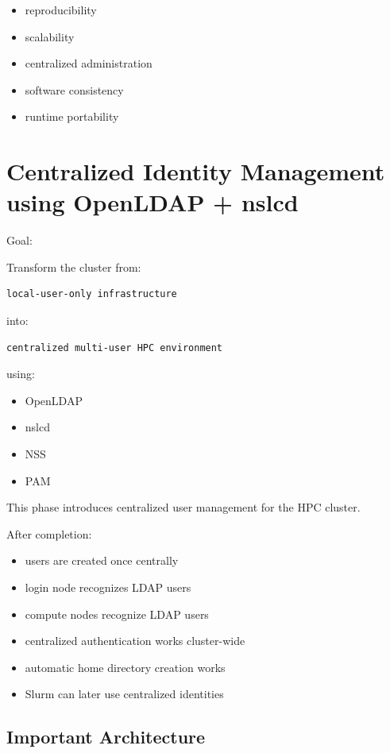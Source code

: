 \documentclass[11pt]{article}
\begin{document}
\begin{itemize}
\item reproducibility
\item scalability
\item centralized administration
\item software consistency
\item runtime portability
\end{itemize}
\section{Centralized Identity Management using OpenLDAP + nslcd}
\label{sec:orgab76256}

Goal:

Transform the cluster from:

\begin{verbatim}
local-user-only infrastructure
\end{verbatim}

into:

\begin{verbatim}
centralized multi-user HPC environment
\end{verbatim}

using:

\begin{itemize}
\item OpenLDAP
\item nslcd
\item NSS
\item PAM
\end{itemize}

This phase introduces centralized user management for the HPC cluster.

After completion:

\begin{itemize}
\item users are created once centrally
\item login node recognizes LDAP users
\item compute nodes recognize LDAP users
\item centralized authentication works cluster-wide
\item automatic home directory creation works
\item Slurm can later use centralized identities
\end{itemize}
\subsection{Important Architecture}
\label{sec:org220e2d3}
\end{document}
